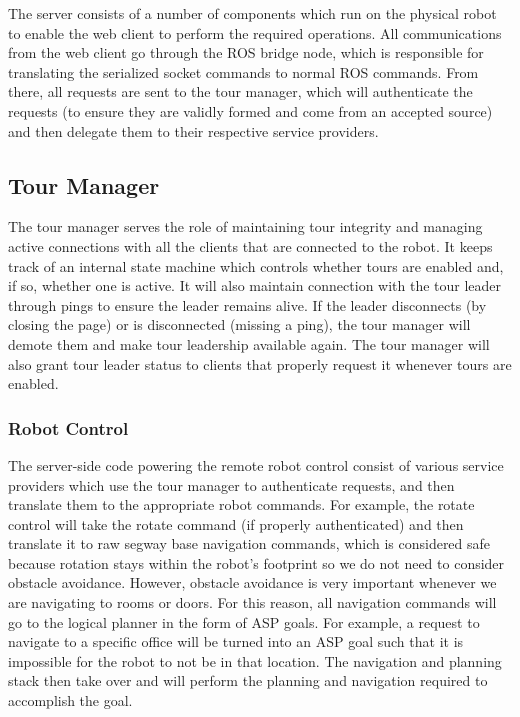 \documentclass[
  oneside,
  11pt, a4paper,
  footinclude=true,
  headinclude=true,
  cleardoublepage=empty
]{article}
\begin{document}
The server consists of a number of components which run on the physical robot
to enable the web client to perform the required operations. All communications
from the web client go through the ROS bridge node, which is responsible
for translating the serialized socket commands to normal ROS commands. From
there, all requests are sent to the tour manager, which will authenticate the
requests (to ensure they are validly formed and come from an accepted source)
and then delegate them to their respective service providers.

\subsection{Tour Manager}

The tour manager serves the role of maintaining tour integrity and managing
active connections with all the clients that are connected to the robot. It
keeps track of an internal state machine which controls whether tours are
enabled and, if so, whether one is active. It will also maintain connection
with the tour leader through pings to ensure the leader remains alive. If the
leader disconnects (by closing the page) or is disconnected (missing a ping),
the tour manager will demote them and make tour leadership available again. The
tour manager will also grant tour leader status to clients that properly
request it whenever tours are enabled.

\subsubsection{Robot Control}

The server-side code powering the remote robot control consist of various
service providers which use the tour manager to authenticate requests, and then
translate them to the appropriate robot commands. For example, the rotate control
will take the rotate command (if properly authenticated) and then translate it
to raw segway base navigation commands, which is considered safe because
rotation stays within the robot's footprint so we do not need to consider
obstacle avoidance. However, obstacle avoidance is very important whenever we
are navigating to rooms or doors. For this reason, all navigation commands will
go to the logical planner in the form of ASP goals. For example, a request to
navigate to a specific office will be turned into an ASP goal such that it is
impossible for the robot to not be in that location. The navigation and
planning stack then take over and will perform the planning and navigation
required to accomplish the goal.
\end{document}
